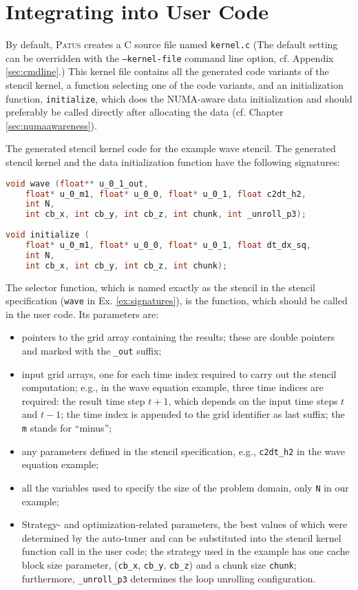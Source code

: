 \chapter{Integrating into User Code}

By default, \textsc{Patus} creates a C source file named \texttt{kernel.c} 
(The default setting can be overridden with the \texttt{--kernel-file} command line option, cf. Appendix \ref{sec:cmdline}.)
This kernel file contains all the generated code variants of the stencil kernel, a function selecting
one of the code variants, and an initialization function,
\texttt{initialize}, which
does the NUMA-aware data initialization and should preferably be called directly after allocating the data (cf. Chapter \ref{sec:numaawareness}).

\begin{example}{The generated stencil kernel code for the example wave stencil.}
	\label{ex:signatures}
	The generated stencil kernel and the data initialization function have the following signatures:

\begin{lstlisting}[language=C, frame={}]
void wave (float** u_0_1_out,
	float* u_0_m1, float* u_0_0, float* u_0_1, float c2dt_h2,
	int N,
	int cb_x, int cb_y, int cb_z, int chunk, int _unroll_p3);
	
void initialize (
	float* u_0_m1, float* u_0_0, float* u_0_1, float dt_dx_sq,
	int N,
	int cb_x, int cb_y, int cb_z, int chunk);
\end{lstlisting}
\end{example}

The selector function, which is named exactly as the stencil in the stencil specification (\texttt{wave} in Ex. \ref{ex:signatures}),
is the function, which should be called in the user code.
Its parameters are:
\begin{itemize}
	\item pointers to the grid array containing the results; these are double pointers and marked with the \texttt{\_out} suffix;
	\item input grid arrays, one for each time index required to carry out the stencil computation; e.g., in the wave equation
		example, three time indices are required: the result time step $t+1$, which depends on the input time steps $t$ and $t-1$;
		the time index is appended to the grid identifier as last suffix; the \texttt{m} stands for ``minus'';
	\item any parameters defined in the stencil specification, e.g., \texttt{c2dt\_h2} in the wave equation example;
	\item all the variables used to specify the size of the problem domain, only \texttt{N} in our example;
	\item Strategy- and optimization-related parameters, the best values of which were determined by the auto-tuner and
		can be substituted into the stencil kernel function call in the user code;
		the strategy used in the example has one cache block size parameter, (\texttt{cb\_x}, \texttt{cb\_y}, \texttt{cb\_z})
		and a chunk size \texttt{chunk}; furthermore, \texttt{\_unroll\_p3} determines the loop unrolling configuration.
\end{itemize}

